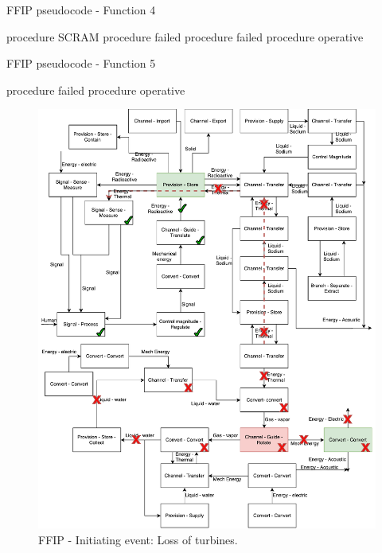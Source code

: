 \begin{algorithm}
\caption{FFIP pseudocode - Function 4}\label{alg:ffip4}
\begin{algorithmic}[1]
 \Return procedure SCRAM
 \Return procedure failed
 \Return procedure failed
\Else{} \Return procedure operative
\EndIf
\EndProcedure
\end{algorithmic}
\end{algorithm}


\begin{algorithm}
\caption{FFIP pseudocode - Function 5}\label{alg:ffip5}
\begin{algorithmic}[1]
 \Return procedure failed
\Else{} \Return procedure operative
\EndIf
\EndProcedure
\end{algorithmic}
\end{algorithm}


\begin{figure}[t]
\centering
\includegraphics[scale=.55]{fig0d/FFIP_2}
\caption{FFIP - Initiating event: Loss of turbines.}
\label{fig:ffip2}
\end{figure}


